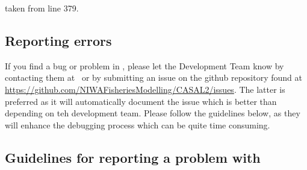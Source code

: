 
taken from line 379.


\subsection{Reporting errors\label{sec:reporting-errors}}

If you find a bug or problem in \CNAME , please let the Development Team know by contacting them at \email\ or by submitting an issue on the github repository found at \url{https://github.com/NIWAFisheriesModelling/CASAL2/issues}. The latter is preferred as it will automatically document the issue which is better than depending on teh development team. Please follow the guidelines below, as they will enhance the debugging process which can be quite time consuming.

\subsection{Guidelines for reporting a problem with \CNAME\label{sec:error-guidelines}}

